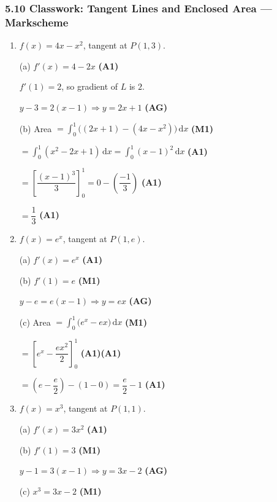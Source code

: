 \documentclass[12pt, twoside]{article}
\begin{document}
\subsubsection*{5.10 Classwork: Tangent Lines and Enclosed Area --- Markscheme}

\begin{enumerate}[itemsep=0.4cm]

\item $f(x) = 4x - x^2$, tangent at $P(1, 3)$.

(a) $f'(x) = 4 - 2x$ \hfill \textbf{(A1)}

$f'(1) = 2$, so gradient of $L$ is $2$.

$y - 3 = 2(x - 1) \Rightarrow y = 2x + 1$ \hfill \textbf{(AG)}

\medskip
(b) Area $= \displaystyle\int_0^1 \bigl((2x + 1) - (4x - x^2)\bigr)\,\mathrm{d}x$
\hfill \textbf{(M1)}

$= \displaystyle\int_0^1 (x^2 - 2x + 1)\,\mathrm{d}x
= \int_0^1 (x - 1)^2\,\mathrm{d}x$ \hfill \textbf{(A1)}

$= \left[\dfrac{(x-1)^3}{3}\right]_0^1 = 0 - \left(\dfrac{-1}{3}\right)$
\hfill \textbf{(A1)}

$= \dfrac{1}{3}$ \hfill \textbf{(A1)}

\bigskip

\item $f(x) = e^x$, tangent at $P(1, e)$.

(a) $f'(x) = e^x$ \hfill \textbf{(A1)}

\medskip
(b) $f'(1) = e$ \hfill \textbf{(M1)}

$y - e = e(x - 1) \Rightarrow y = ex$ \hfill \textbf{(AG)}

\medskip
(c) Area $= \displaystyle\int_0^1 \bigl(e^x - ex\bigr)\,\mathrm{d}x$
\hfill \textbf{(M1)}

$= \left[e^x - \dfrac{ex^2}{2}\right]_0^1$ \hfill \textbf{(A1)(A1)}

$= \left(e - \dfrac{e}{2}\right) - (1 - 0)
= \dfrac{e}{2} - 1$ \hfill \textbf{(A1)}

\bigskip

\item $f(x) = x^3$, tangent at $P(1, 1)$.

(a) $f'(x) = 3x^2$ \hfill \textbf{(A1)}

\medskip
(b) $f'(1) = 3$ \hfill \textbf{(M1)}

$y - 1 = 3(x - 1) \Rightarrow y = 3x - 2$ \hfill \textbf{(AG)}

\medskip
(c) $x^3 = 3x - 2$ \hfill \textbf{(M1)}


\end{enumerate}
\end{document}
